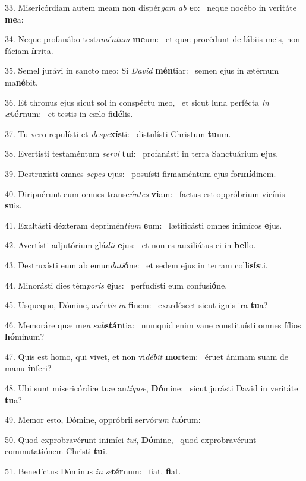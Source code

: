 33. Misericórdiam autem meam non dispér\textit{gam} \textit{ab} \textbf{e}o: \ast\  neque nocébo in veritáte \textbf{me}a:\

34. Neque profanábo testa\textit{mén}\textit{tum} \textbf{me}um: \ast\  et quæ procédunt de lábiis meis, non fáciam \textbf{ír}rita.\

35. Semel jurávi in sancto meo: Si \textit{Da}\textit{vid} \textbf{mén}tiar: \ast\  semen ejus in ætérnum ma\textbf{né}bit.\

36. Et thronus ejus sicut sol in conspéctu meo, \dag\  et sicut luna perfécta \textit{in} \textit{æ}\textbf{tér}num: \ast\  et testis in cælo fi\textbf{dé}lis.\

37. Tu vero repulísti et \textit{de}\textit{spe}\textbf{xís}ti: \ast\  distulísti Christum \textbf{tu}um.\

38. Evertísti testaméntum \textit{ser}\textit{vi} \textbf{tu}i: \ast\  profanásti in terra Sanctuárium \textbf{e}jus.\

39. Destruxísti omnes \textit{se}\textit{pes} \textbf{e}jus: \ast\  posuísti firmaméntum ejus for\textbf{mí}dinem.\

40. Diripuérunt eum omnes transe\textit{ún}\textit{tes} \textbf{vi}am: \ast\  factus est oppróbrium vicínis \textbf{su}is.\

41. Exaltásti déxteram deprimén\textit{ti}\textit{um} \textbf{e}um: \ast\  lætificásti omnes inimícos \textbf{e}jus.\

42. Avertísti adjutórium glá\textit{di}\textit{i} \textbf{e}jus: \ast\  et non es auxiliátus ei in \textbf{bel}lo.\

43. Destruxísti eum ab emun\textit{da}\textit{ti}\textbf{ó}ne: \ast\  et sedem ejus in terram colli\textbf{sís}ti.\

44. Minorásti dies tém\textit{po}\textit{ris} \textbf{e}jus: \ast\  perfudísti eum confusi\textbf{ó}ne.\

45. Usquequo, Dómine, avér\textit{tis} \textit{in} \textbf{fi}nem: \ast\  exardéscet sicut ignis ira \textbf{tu}a?\

46. Memoráre quæ me\textit{a} \textit{sub}\textbf{stán}tia: \ast\  numquid enim vane constituísti omnes fílios \textbf{hó}minum?\

47. Quis est homo, qui vivet, et non vi\textit{dé}\textit{bit} \textbf{mor}tem: \ast\  éruet ánimam suam de manu \textbf{ín}feri?\

48. Ubi sunt misericórdiæ tuæ an\textit{tí}\textit{quæ}, \textbf{Dó}mine: \ast\  sicut jurásti David in veritáte \textbf{tu}a?\

49. Memor esto, Dómine, oppróbrii servó\textit{rum} \textit{tu}\textbf{ó}rum: \ast\  \

50. Quod exprobravérunt inimíci \textit{tu}\textit{i}, \textbf{Dó}mine, \ast\  quod exprobravérunt commutatiónem Christi \textbf{tu}i.\

51. Benedíctus Dóminus \textit{in} \textit{æ}\textbf{tér}num: \ast\  fiat, \textbf{fi}at.\

